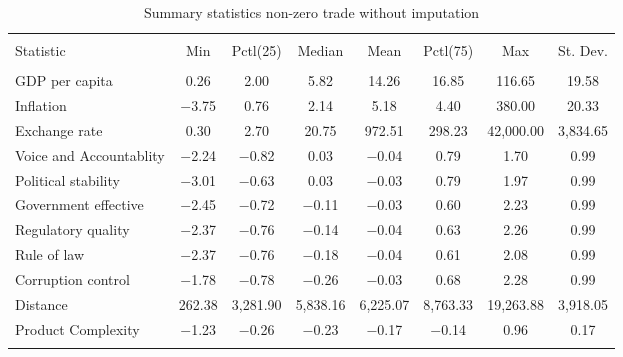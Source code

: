 
\begin{table}[H] \centering 
  \caption{Summary statistics non-zero trade without imputation} 
  \label{fig:sum_trade_noimp} 
\begin{tabular}{@{\extracolsep{5pt}}lccccccc} 
\\[-1.8ex]\hline 
\hline \\[-1.8ex] 
Statistic & \multicolumn{1}{c}{Min} & \multicolumn{1}{c}{Pctl(25)} & \multicolumn{1}{c}{Median} & \multicolumn{1}{c}{Mean} & \multicolumn{1}{c}{Pctl(75)} & \multicolumn{1}{c}{Max} & \multicolumn{1}{c}{St. Dev.} \\ 
\hline \\[-1.8ex] 
GDP per capita & 0.26 & 2.00 & 5.82 & 14.26 & 16.85 & 116.65 & 19.58 \\ 
Inflation & $-$3.75 & 0.76 & 2.14 & 5.18 & 4.40 & 380.00 & 20.33 \\ 
Exchange rate & 0.30 & 2.70 & 20.75 & 972.51 & 298.23 & 42,000.00 & 3,834.65 \\ 
Voice and Accountablity & $-$2.24 & $-$0.82 & 0.03 & $-$0.04 & 0.79 & 1.70 & 0.99 \\ 
Political stability & $-$3.01 & $-$0.63 & 0.03 & $-$0.03 & 0.79 & 1.97 & 0.99 \\ 
Government effective & $-$2.45 & $-$0.72 & $-$0.11 & $-$0.03 & 0.60 & 2.23 & 0.99 \\ 
Regulatory quality & $-$2.37 & $-$0.76 & $-$0.14 & $-$0.04 & 0.63 & 2.26 & 0.99 \\ 
Rule of law & $-$2.37 & $-$0.76 & $-$0.18 & $-$0.04 & 0.61 & 2.08 & 0.99 \\ 
Corruption control & $-$1.78 & $-$0.78 & $-$0.26 & $-$0.03 & 0.68 & 2.28 & 0.99 \\ 
Distance & 262.38 & 3,281.90 & 5,838.16 & 6,225.07 & 8,763.33 & 19,263.88 & 3,918.05 \\ 
Product Complexity & $-$1.23 & $-$0.26 & $-$0.23 & $-$0.17 & $-$0.14 & 0.96 & 0.17 \\ 
\hline \\[-1.8ex] 
\end{tabular} 
\end{table} 
